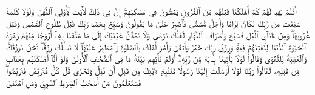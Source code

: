 أَفَلَمۡ يَهۡدِ لَهُمۡ كَمۡ أَهۡلَكۡنَا قَبۡلَهُم مِّنَ ٱلۡقُرُونِ يَمۡشُونَ فِي مَسَٰكِنِهِمۡۚ إِنَّ فِي ذَٰلِكَ لَأٓيَٰتٖ لِّأُوْلِي ٱلنُّهَىٰ
وَلَوۡلَا كَلِمَةٞ سَبَقَتۡ مِن رَّبِّكَ لَكَانَ لِزَامٗا وَأَجَلٞ مُّسَمّٗى
فَٱصۡبِرۡ عَلَىٰ مَا يَقُولُونَ وَسَبِّحۡ بِحَمۡدِ رَبِّكَ قَبۡلَ طُلُوعِ ٱلشَّمۡسِ وَقَبۡلَ غُرُوبِهَاۖ وَمِنۡ ءَانَآيِٕ ٱلَّيۡلِ فَسَبِّحۡ وَأَطۡرَافَ ٱلنَّهَارِ لَعَلَّكَ تَرۡضَىٰ
وَلَا تَمُدَّنَّ عَيۡنَيۡكَ إِلَىٰ مَا مَتَّعۡنَا بِهِۦٓ أَزۡوَٰجٗا مِّنۡهُمۡ زَهۡرَةَ ٱلۡحَيَوٰةِ ٱلدُّنۡيَا لِنَفۡتِنَهُمۡ فِيهِۚ وَرِزۡقُ رَبِّكَ خَيۡرٞ وَأَبۡقَىٰ
وَأۡمُرۡ أَهۡلَكَ بِٱلصَّلَوٰةِ وَٱصۡطَبِرۡ عَلَيۡهَاۖ لَا نَسۡـَٔلُكَ رِزۡقٗاۖ نَّحۡنُ نَرۡزُقُكَۗ وَٱلۡعَٰقِبَةُ لِلتَّقۡوَىٰ
وَقَالُواْ لَوۡلَا يَأۡتِينَا بِـَٔايَةٖ مِّن رَّبِّهِۦٓۚ أَوَلَمۡ تَأۡتِهِم بَيِّنَةُ مَا فِي ٱلصُّحُفِ ٱلۡأُولَىٰ
وَلَوۡ أَنَّآ أَهۡلَكۡنَٰهُم بِعَذَابٖ مِّن قَبۡلِهِۦ لَقَالُواْ رَبَّنَا لَوۡلَآ أَرۡسَلۡتَ إِلَيۡنَا رَسُولٗا فَنَتَّبِعَ ءَايَٰتِكَ مِن قَبۡلِ أَن نَّذِلَّ وَنَخۡزَىٰ
قُلۡ كُلّٞ مُّتَرَبِّصٞ فَتَرَبَّصُواْۖ فَسَتَعۡلَمُونَ مَنۡ أَصۡحَٰبُ ٱلصِّرَٰطِ ٱلسَّوِيِّ وَمَنِ ٱهۡتَدَىٰ